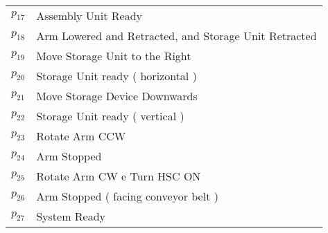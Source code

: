 \begin{table}[htbp]
\begin{tabular}{M{5cm}M{10cm}}
\hyperlink{partialNet:p171}{\hypertarget{partialTable:p17}{$p_{17}$}} & Assembly Unit Ready\\
\hyperlink{partialNet:p181}{\hypertarget{partialTable:p18}{$p_{18}$}} & Arm Lowered and Retracted, and Storage Unit Retracted\\
\hyperlink{partialNet:p191}{\hypertarget{partialTable:p19}{$p_{19}$}} & Move Storage Unit to the Right\\
\hyperlink{partialNet:p201}{\hypertarget{partialTable:p20}{$p_{20}$}} & Storage Unit ready ( horizontal )\\
\hyperlink{partialNet:p211}{\hypertarget{partialTable:p21}{$p_{21}$}} & Move Storage Device Downwards\\
\hyperlink{partialNet:p221}{\hypertarget{partialTable:p22}{$p_{22}$}} & Storage Unit ready ( vertical )\\
\hyperlink{partialNet:p231}{\hypertarget{partialTable:p23}{$p_{23}$}} & Rotate Arm CCW\\
\hyperlink{partialNet:p241}{\hypertarget{partialTable:p24}{$p_{24}$}} & Arm Stopped\\
\hyperlink{partialNet:p251}{\hypertarget{partialTable:p25}{$p_{25}$}} & Rotate Arm CW e Turn HSC ON\\
\hyperlink{partialNet:p261}{\hypertarget{partialTable:p26}{$p_{26}$}} & Arm Stopped ( facing conveyor belt )\\
\hyperlink{partialNet:p271}{\hypertarget{partialTable:p27}{$p_{27}$}} & System Ready\\
\end{tabular}
\end{table}
